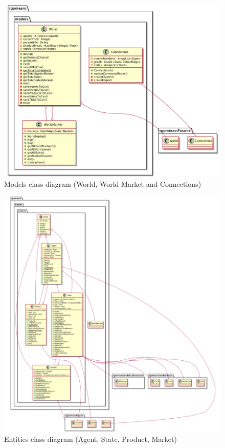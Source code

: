     \begin{figure}[H]
        \centering
        \includegraphics[width=1\textwidth]{img/modelsCD.png}
        \caption{Models class diagram (World, World Market and Connections)}
        \label{fig:class_diagram_models}
    \end{figure}


    \begin{figure}[H]
        \centering
        \includegraphics[width=1\textwidth]{img/entitiesCD.png}
        \caption{Entities class diagram (Agent, State, Product, Market)}
        \label{fig:class_diagram_entities}
    \end{figure}


